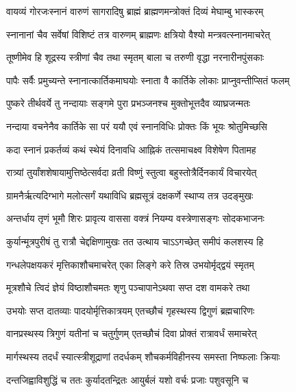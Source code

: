 \twolineshloka
{वायव्यं गोरजःस्नानं वारुणं सागरादिषु}
{ब्राह्मं ब्राह्मणमन्त्रोक्तं दिव्यं मेघाम्बु भास्करम्} %

\twolineshloka
{स्नानानां चैव सर्वेषां विशिष्टं तत्र वारुणम्}
{ब्राह्मणः क्षत्रियो वैश्यो मन्त्रवत्स्नानमाचरेत्} %

\twolineshloka
{तूष्णीमेव हि शूद्रस्य स्त्रीणां चैव तथा स्मृतम्}
{बाला च तरुणी वृद्धा नरनारीनपुंसकाः} %

\twolineshloka
{पापैः सर्वैः प्रमुच्यन्ते स्नानात्कार्तिकमाघयोः}
{स्नाता वै कार्तिके लोकाः प्राप्नुवन्तीप्सितं फलम्} %

\twolineshloka
{पुष्करे तीर्थवर्ये तु नन्दायाः सङ्गमे पुरा}
{प्रभञ्जनश्च मुक्तोभूत्तदैव व्याघ्रजन्मतः} %

\twolineshloka
{नन्दाया वचनेनैव कार्तिके सा परं ययौ}
{एवं स्नानविधिः प्रोक्तः किं भूयः श्रोतुमिच्छसि} %





\twolineshloka
{कदा स्नानं प्रकर्तव्यं कथं स्थेयं दिनावधि}
{आह्निकं तत्समाचक्ष्व विशेषेण पितामह} %

\twolineshloka
{रात्र्यां तुर्यांशशेषायामुत्तिष्ठेत्सर्वदा व्रती}
{विष्णुं स्तुत्वा बहुस्तोत्रैर्दिनकार्यं विचारयेत्} %

\twolineshloka
{ग्रामनैर्ऋत्यदिग्भागे मलोत्सर्गं यथाविधि}
{ब्रह्मसूत्रं दक्षकर्णे स्थाप्य तत्र उदङ्मुखः} %

\twolineshloka
{अन्तर्धाय तृणं भूमौ शिरः प्रावृत्य वाससा}
{वक्त्रं नियम्य वस्त्रेणासङ्गः सोदकभाजनः} %

\twolineshloka
{कुर्यान्मूत्रपुरीषं तु रात्रौ चेद्दक्षिणामुखः}
{तत उत्थाय चाऽऽगच्छेत् समीपं कलशस्य हि} %

\twolineshloka
{गन्धलेपक्षयकरं मृत्तिकाशौचमाचरेत्}
{एका लिङ्गे करे तिस्र उभयोर्मृद्द्वयं स्मृतम्} %

\twolineshloka
{मूत्रशौचे त्विदं ज्ञेयं विष्ठाशौचमतः शृणु}
{पञ्चापानेऽथवा सप्त दश वामकरे तथा} %

\twolineshloka
{उभयोः सप्त दातव्याः पादयोर्मृत्तिकात्रयम्}
{एतच्छौचं गृहस्थस्य द्विगुणं ब्रह्मचारिणः} %

\twolineshloka
{वानप्रस्थस्य त्रिगुणं यतीनां च चतुर्गुणम्}
{एतच्छौचं दिवा प्रोक्तं रात्रावर्धं समाचरेत्} %

\twolineshloka
{मार्गस्थस्य तदर्धं स्यात्स्त्रीशूद्राणां तदर्धकम्}
{शौचकर्मविहीनस्य समस्ता निष्फलाः क्रियाः} %

\twolineshloka
{दन्तजिह्वाविशुद्धिं च ततः कुर्यादतन्द्रितः}
{आयुर्बलं यशो वर्चः प्रजाः पशुवसूनि च} %

